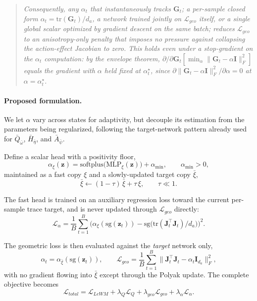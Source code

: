 ﻿\documentclass{article}
\begin{document}
    \begin{quote}
        \itshape
        Consequently, any $\alpha_t$ that instantaneously tracks $\mathbf{G}_t$; a
        per-sample closed form $\alpha_t = \mathrm{tr}(\mathbf{G}_t)/d_a$, a network
        trained jointly on $\mathcal{L}_{geo}$ itself, or a single global scalar
        optimized by gradient descent on the same batch; reduces $\mathcal{L}_{geo}$
        to an anisotropy-only penalty that imposes \emph{no} pressure against
        collapsing the action-effect Jacobian to zero. This holds even under a
        stop-gradient on the $\alpha_t$ computation: by the envelope theorem,
        $\partial/\partial \mathbf{G}_t \left[\min_\alpha \|\mathbf{G}_t -
        \alpha\mathbf{I}\|_F^2\right]$ equals the gradient with $\alpha$ held fixed at
        $\alpha^\star_t$, since $\partial \|\mathbf{G}_t - \alpha\mathbf{I}\|_F^2 /
        \partial \alpha = 0$ at $\alpha = \alpha_t^\star$.
    \end{quote}


    \paragraph{Proposed formulation.}
        We let $\alpha$ vary across states for adaptivity, but decouple its
        estimation from the parameters being regularized, following the
        target-network pattern already used for $\bar{Q}_{\bar\omega}$,
        $\bar{H}_{\bar\eta}$, and $\bar{A}_{\bar\psi}$.
         
        Define a scalar head with a positivity floor,
        \[
        \alpha_\xi(\mathbf{z}) = \mathrm{softplus}\big(\mathrm{MLP}_\xi(\mathbf{z})\big)
        + \alpha_{\min}, \qquad \alpha_{\min} > 0,
        \]
        maintained as a fast copy $\xi$ and a slowly-updated target copy $\bar\xi$,
        \[
        \bar\xi \leftarrow (1-\tau)\,\bar\xi + \tau\,\xi, \qquad \tau \ll 1.
        \]
         
        The fast head is trained on an auxiliary regression loss toward the current
        per-sample trace target, and is never updated through $\mathcal{L}_{geo}$
        directly:
        \[
        \mathcal{L}_\alpha = \frac{1}{B}\sum_{t=1}^{B}
        \Big(\alpha_\xi(\mathrm{sg}(\mathbf{z}_t))
        - \mathrm{sg}\big(\mathrm{tr}(\mathbf{J}_t^\top \mathbf{J}_t)/d_a\big)\Big)^2.
        \]
         
        The geometric loss is then evaluated against the \emph{target} network only,
        \[
        \alpha_t = \alpha_{\bar\xi}(\mathrm{sg}(\mathbf{z}_t)), \qquad
        \mathcal{L}_{geo} = \frac{1}{B}\sum_{t=1}^{B}
        \big\|\mathbf{J}_t^\top \mathbf{J}_t - \alpha_t \mathbf{I}_{d_a}\big\|_F^2,
        \]
        with no gradient flowing into $\bar\xi$ except through the Polyak update. The
        complete objective becomes
        \[
        \mathcal{L}_{total} = \mathcal{L}_{LeWM} + \lambda_Q \mathcal{L}_Q
        + \lambda_{geo} \mathcal{L}_{geo} + \lambda_\alpha \mathcal{L}_\alpha.
        \]
   
\end{document}
